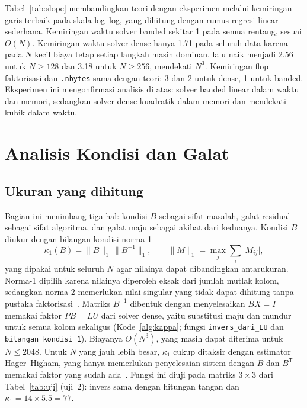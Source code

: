 \documentclass[12pt,a4paper]{article}
\newcommand{\T}{\mathsf{T}}
\numberwithin{equation}{section}
\begin{document}
Tabel~\ref{tab:slope} membandingkan teori dengan eksperimen melalui kemiringan garis terbaik pada skala log--log,
yang dihitung dengan rumus regresi linear sederhana. Kemiringan waktu solver banded sekitar 1 pada semua rentang,
sesuai $O(N)$. Kemiringan waktu solver dense hanya 1.71 pada seluruh data karena pada $N$ kecil biaya tetap setiap
langkah masih dominan, lalu naik menjadi 2.56 untuk $N\ge128$ dan 3.18 untuk $N\ge256$, mendekati $N^3$. Kemiringan flop
faktorisasi dan \texttt{.nbytes} sama dengan teori: 3 dan 2 untuk dense, 1 untuk banded. Eksperimen ini mengonfirmasi analisis di
atas: solver banded linear dalam waktu dan memori, sedangkan solver dense kuadratik dalam memori dan mendekati kubik
dalam waktu.

\section{Analisis Kondisi dan Galat}\label{sec:kondisi}

\subsection{Ukuran yang dihitung}
Bagian ini menimbang tiga hal: kondisi $B$ sebagai sifat masalah, galat residual sebagai sifat algoritma, dan galat
maju sebagai akibat dari keduanya. Kondisi $B$ diukur dengan bilangan kondisi norma-1
\begin{equation}\label{eq:kappa}
\kappa_1(B)=\lVert B\rVert_1\,\lVert B^{-1}\rVert_1,\qquad
\lVert M\rVert_1=\max_{j}\sum_{i}\lvert M_{ij}\rvert,
\end{equation}
yang dipakai untuk seluruh $N$ agar nilainya dapat dibandingkan antarukuran. Norma-1 dipilih karena nilainya
diperoleh eksak dari jumlah mutlak kolom, sedangkan norma-2 memerlukan nilai singular yang tidak dapat dihitung tanpa
pustaka faktorisasi~\cite{heath}. Matriks $B^{-1}$ dibentuk dengan menyelesaikan $BX=I$ memakai faktor $PB=LU$ dari
solver dense, yaitu substitusi maju dan mundur untuk semua kolom sekaligus (Kode~\ref{alg:kappa}; fungsi
\texttt{invers\_dari\_LU} dan \texttt{bilangan\_kondisi\_1}). Biayanya $O(N^3)$, yang masih dapat diterima untuk
$N\le2048$. Untuk $N$ yang jauh lebih besar, $\kappa_1$ cukup ditaksir dengan estimator Hager--Higham, yang hanya
memerlukan penyelesaian sistem dengan $B$ dan $B^\T$ memakai faktor yang sudah ada~\cite{higham}. Fungsi ini diuji
pada matriks $3\times3$ dari Tabel~\ref{tab:uji} (uji~2): invers sama dengan hitungan tangan dan
$\kappa_1=14\times5.5=77$.
\end{document}
